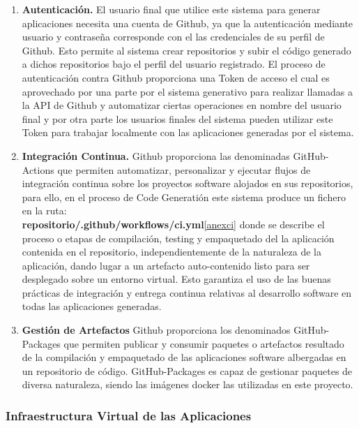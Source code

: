 \documentclass[a4paper,11pt]{book}
\begin{document}
\begin{enumerate}
\item \textbf{ Autenticación.} El usuario final que utilice este sistema para generar aplicaciones necesita una cuenta de Github, ya que la autenticación mediante usuario y contraseña corresponde con el las credenciales  de su perfil de Github. Esto permite al sistema crear repositorios y subir el código generado a dichos repositorios bajo el perfil del usuario registrado. El proceso de autenticación contra Github proporciona una Token  de acceso el cual es aprovechado por una parte por el sistema generativo para realizar llamadas a la API  de Github y automatizar ciertas operaciones en nombre del usuario final y por otra parte los usuarios finales del sistema  pueden utilizar este Token para trabajar localmente con las aplicaciones generadas por el sistema.

\item   \textbf{Integración Continua.} Github proporciona las denominadas GitHub-Actions\cite{github3}  que permiten automatizar, personalizar y ejecutar flujos de integración continua  sobre los proyectos software alojados en sus repositorios, para ello, en el proceso de Code Generatión este sistema produce un fichero  en la ruta:\\
\textbf{repositorio/.github/workflows/ci.yml}\ref{anexci} donde se describe el proceso o etapas de compilación, testing y empaquetado del la aplicación contenida en el repositorio, independientemente de la naturaleza de la aplicación, dando lugar a un artefacto auto-contenido listo para ser desplegado sobre un entorno virtual. Esto garantiza el uso de las buenas prácticas  de integración y entrega continua relativas al desarrollo software en todas las aplicaciones generadas.

\item \textbf{Gestión de Artefactos} Github proporciona los denominados GitHub-Packages\cite{github4} que permiten publicar y consumir paquetes o artefactos resultado de la compilación y empaquetado de las aplicaciones software albergadas en un repositorio de código. GitHub-Packages es capaz de gestionar paquetes de diversa naturaleza, siendo las imágenes docker las utilizadas en este proyecto.
\end{enumerate}

\subsubsection{Infraestructura Virtual de las Aplicaciones}\label{infra}
\end{document}
